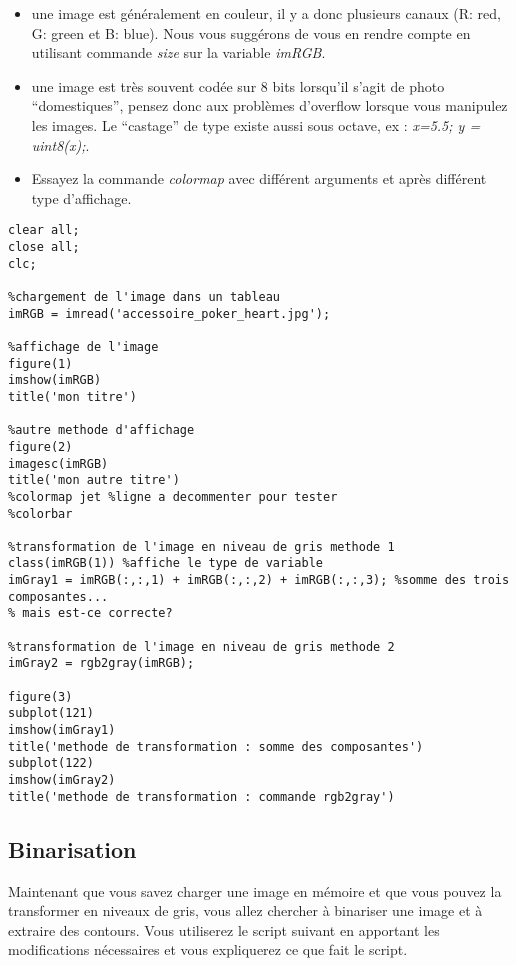 \documentclass[10pt,a4paper]{article}
\begin{document}
\begin{itemize}
	\item une image est g\'{e}n\'{e}ralement en couleur, il y a donc plusieurs canaux (R: red, G: green et B: blue). Nous vous sugg\'{e}rons de vous en rendre compte en utilisant commande \textit{size} sur la variable \textit{imRGB}.
	\item une image est tr\`{e}s souvent cod\'{e}e sur 8 bits lorsqu'il s'agit de photo ``domestiques'', pensez donc aux probl\`{e}mes d'overflow lorsque vous manipulez les images. Le ``castage'' de type existe aussi sous octave, ex : \textit{x=5.5; y = uint8(x);}.
	\item Essayez la commande \textit{colormap} avec diff\'{e}rent arguments et apr\`{e}s diff\'{e}rent type d'affichage.
\end{itemize}

\begin{verbatim}
clear all;
close all;
clc;

%chargement de l'image dans un tableau
imRGB = imread('accessoire_poker_heart.jpg');

%affichage de l'image
figure(1)
imshow(imRGB)
title('mon titre')

%autre methode d'affichage
figure(2)
imagesc(imRGB)
title('mon autre titre')
%colormap jet %ligne a decommenter pour tester
%colorbar

%transformation de l'image en niveau de gris methode 1
class(imRGB(1)) %affiche le type de variable
imGray1 = imRGB(:,:,1) + imRGB(:,:,2) + imRGB(:,:,3); %somme des trois composantes...
% mais est-ce correcte?

%transformation de l'image en niveau de gris methode 2
imGray2 = rgb2gray(imRGB);

figure(3)
subplot(121)
imshow(imGray1)
title('methode de transformation : somme des composantes')
subplot(122)
imshow(imGray2)
title('methode de transformation : commande rgb2gray')

\end{verbatim}




\subsection{Binarisation}

Maintenant que vous savez charger une image en m\'{e}moire et que vous pouvez la transformer en niveaux de gris, vous allez chercher \`{a} binariser une image et \`{a} extraire des contours. Vous utiliserez le script suivant en apportant les modifications n\'{e}cessaires et vous expliquerez ce que fait le script.
\end{document}
